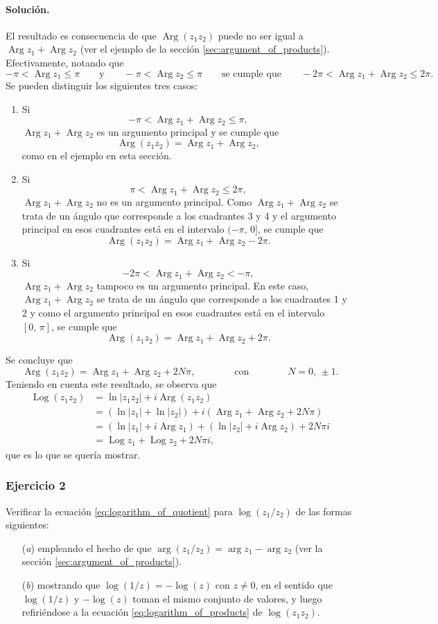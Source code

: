 \documentclass[a4paper]{report}
\DeclareMathOperator{\Arg}{Arg}
\DeclareMathOperator{\Log}{Log}
\begin{document}
\paragraph{Solución.} El resultado es consecuencia de que \(\Arg(z_1z_2)\) puede no ser igual a \(\Arg z_1+\Arg z_2\) (ver el ejemplo de la sección \ref{sec:argument_of_products}). Efectivamente, notando que 
\[
 -\pi<\Arg z_1\leq\pi
 \qquad\textrm{y}\qquad
 -\pi<\Arg z_2\leq\pi
 \qquad\textrm{se cumple que}\qquad
 -2\pi<\Arg z_1+\Arg z_2\leq2\pi.
\]
Se pueden distinguir los siguientes tres casos:
\begin{enumerate}
 \item Si
 \[
 -\pi<\Arg z_1+\Arg z_2\leq\pi,
 \]
 \(\Arg z_1+\Arg z_2\) es un argumento principal y se cumple que 
 \[
  \Arg(z_1z_2)=\Arg z_1+\Arg z_2,
 \]
 como en el ejemplo en esta sección.
 \item Si
 \[
  \pi<\Arg z_1+\Arg z_2\leq2\pi,
 \]
 \(\Arg z_1+\Arg z_2\) no es un argumento principal. Como \(\Arg z_1+\Arg z_2\) se trata de un ángulo que corresponde a los cuadrantes 3 y 4 y el argumento principal en esos cuadrantes está en el intervalo \((-\pi,\,0]\), se cumple que 
 \[
  \Arg(z_1z_2)=\Arg z_1+\Arg z_2-2\pi.
 \]
 \item Si
 \[
  -2\pi<\Arg z_1+\Arg z_2<-\pi,
 \]
 \(\Arg z_1+\Arg z_2\) tampoco es un argumento principal. En este caso, \(\Arg z_1+\Arg z_2\) se trata de un ángulo que corresponde a los cuadrantes 1 y 2 y como el argumento principal en esos cuadrantes está en el intervalo \([0,\,\pi]\), se cumple que 
 \[
  \Arg(z_1z_2)=\Arg z_1+\Arg z_2+2\pi.
 \]
\end{enumerate}
Se concluye que 
\[
 \Arg(z_1z_2)=\Arg z_1+\Arg z_2+2N\pi,
 \qquad\qquad\textrm{con}\qquad\qquad
 N=0,\,\pm1.
\]
Teniendo en cuenta este resultado, se observa que 
\begin{align*}
 \Log(z_1z_2)&=\ln|z_1z_2|+i\Arg(z_1z_2)\\
   &=(\ln|z_1|+\ln|z_2|)+i(\Arg z_1+\Arg z_2+2N\pi)\\
   &=(\ln|z_1|+i\Arg z_1)+(\ln|z_2|+i\Arg z_2)+2N\pi i\\
   &=\Log z_1+\Log z_2+2N\pi i,
\end{align*}
que es lo que se quería mostrar.

\subsubsection{Ejercicio 2}

Verificar la ecuación \ref{eq:logarithm_of_quotient} para \(\log(z_1/z_2)\) de las formas siguientes:
\begin{enumerate}
 \item[(\textit{a})] empleando el hecho de que \(\arg(z_1/z_2)=\arg z_1-\arg z_2\) (ver la sección \ref{sec:argument_of_products}).
 \item[(\textit{b})] mostrando que \(\log(1/z)=-\log(z)\) con \(z\neq0\), en el sentido que \(\log(1/z)\) y \(-\log(z)\) toman el mismo conjunto de valores, y luego refiriéndose a la ecuación \ref{eq:logarithm_of_products} de \(\log(z_1z_2)\).
\end{enumerate}
\end{document}
